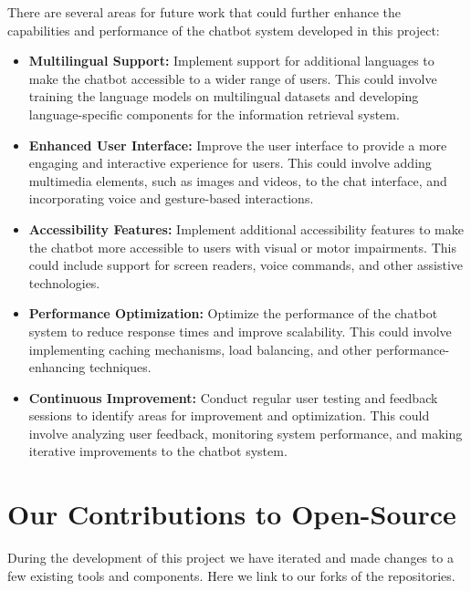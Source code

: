 \documentclass[a4paper,12pt,twoside]{ThesisStyle}
\begin{document}
There are several areas for future work that could further enhance the capabilities and performance of the chatbot system developed in this project:

\begin{itemize}
  \item \textbf{Multilingual Support:} Implement support for additional languages to make the chatbot accessible to a wider range of users. This could involve training the language models on multilingual datasets and developing language-specific components for the information retrieval system.
  \item \textbf{Enhanced User Interface:} Improve the user interface to provide a more engaging and interactive experience for users. This could involve adding multimedia elements, such as images and videos, to the chat interface, and incorporating voice and gesture-based interactions.
  \item \textbf{Accessibility Features:} Implement additional accessibility features to make the chatbot more accessible to users with visual or motor impairments. This could include support for screen readers, voice commands, and other assistive technologies.
  \item \textbf{Performance Optimization:} Optimize the performance of the chatbot system to reduce response times and improve scalability. This could involve implementing caching mechanisms, load balancing, and other performance-enhancing techniques.
  \item \textbf{Continuous Improvement:} Conduct regular user testing and feedback sessions to identify areas for improvement and optimization. This could involve analyzing user feedback, monitoring system performance, and making iterative improvements to the chatbot system.
\end{itemize}

\section{Our Contributions to Open-Source}
\label{sec:oss_contributions}

During the development of this project we have iterated and made changes to a few existing tools and components. Here we link to our forks of the repositories.
\end{document}
